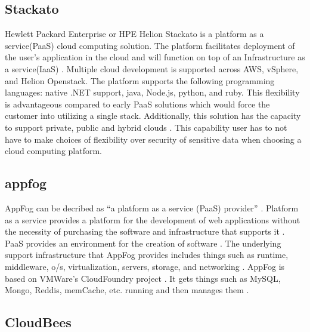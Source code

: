 \subsection{Stackato}
    
    Hewlett Packard Enterprise or HPE Helion Stackato is a platform as
    a service(PaaS) cloud computing solution.  The platform
    facilitates deployment of the user’s application in the cloud and
    will function on top of an Infrastructure as a
    service(IaaS) \cite{www-hpe}. Multiple cloud development is
    supported across AWS, vSphere, and Helion Openstack.  The platform
    supports the following programming languages: native .NET support,
    java, Node.js, python, and ruby.  This flexibility is advantageous
    compared to early PaaS solutions which would force the customer
    into utilizing a single stack.  Additionally, this solution has
    the capacity to support private, public and hybrid clouds
    \cite{www-virt}. This capability user has to not have to make
    choices of flexibility over security of sensitive data when
    choosing a cloud computing platform.

    \pv
 
    
\subsection{appfog}

    AppFog can be decribed as ``a platform as a service (PaaS)
    provider'' \cite{wee}. Platform as a service provides a platform for the
    development of web applications without the necessity of
    purchasing the software and infrastructure that supports
    it \cite{kepes}. PaaS provides an environment for the creation of
    software \cite{kepes}. The underlying support infrastructure that AppFog
    provides includes things such as runtime, middleware, o/s,
    virtualization, servers, storage, and networking \cite{appfog}. AppFog
    is based on VMWare’s CloudFoundry project \cite{wee}. It gets things
    such as MySQL, Mongo, Reddis, memCache, etc. running and then
    manages them \cite{tweney}.

    \pv
    
\subsection{CloudBees}

